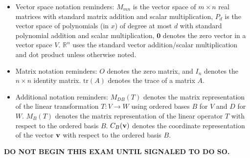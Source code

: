 \documentclass[12pt]{extarticle}
\begin{document}
\begin{itemize}
 \vspace{-0.2cm} 
  \item Vector space notation reminders: $M_{mn}$ is the vector space of $m\times n$ real matrices with standard matrix addition and scalar multiplication, $P_d$ is the vector space of polynomials (in $x$) of degree at most $d$ with standard polynomial addition and scalar multiplication, $\mathbf{0}$ denotes the zero vector in a vector space $V$. $\mathbb{R}^n$ uses the standard vector addition/scalar multiplication and dot product unless otherwise noted. \vspace{-0.2cm} 
 \item Matrix notation reminders: $O$ denotes the zero matrix, and $I_n$ denotes the $n\times n$ identity matrix. $\text{tr}(A)$ denotes the trace of a matrix $A$.  \vspace{-0.2cm} 
 \item Additional notation reminders: $M_{DB}(T)$ denotes the matrix representation of the linear transformation $T:V\to W$ using ordered bases $B$ for $V$ and $D$ for $W$. $M_B(T)$ denotes the matrix representation of the linear operator $T$ with respect to the ordered basis $B$. $C_B({\mathbf{v}})$ denotes the coordinate representation of the vector ${\mathbf{v}}$ with respect to the ordered basis $B$. 

  
\end{itemize}

\bigskip

\textbf{DO NOT BEGIN THIS EXAM UNTIL SIGNALED TO DO SO.}



\newpage
\end{document}

